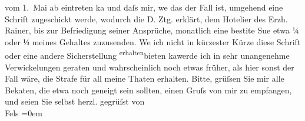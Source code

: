 \begin{ledgroupsized}[t]{13cm}
                    vom 1. Mai ab eintreten ka{\geminationn} und  daſs mir, we{\geminationn}
                    das der Fall ist, umgehend eine Schrift zugeschickt werde, wodurch die D. Ztg. erklärt, dem Hotelier des Erzh. Rainer, bis zur Befriedigung seiner Ansprüche,
                    monatlich eine besti{\geminationm}te Su{\geminationm}e etwa ¼ \introOben{}oder ⅓\introOben{} meines
                    Gehaltes zuzusenden. We{\geminationn} ich nicht in kürzester
                    Kürze diese Schrift oder eine andere Sicherstellung \substVorne{}\textsuperscript{erhalten}{\allowbreak}\substDazwischen{}bieten ka{\geminationn}\substHinten{}{ }{\pb}werde ich in sehr unangenehme
                    Verwickelungen geraten und wahrscheinlich noch etwas früher, als hier sonst der
                    Fall wäre, die Strafe für all meine Thaten erhalten.\pend
           \pstart
           Bitte, grüſsen Sie mir alle Beka{\geminationn}ten, die etwa noch
                    geneigt sein sollten, einen Gruſs von mir zu empfangen, und seien Sie selbst
                    herzl. gegrüſst\pend
           \pstart
           von{\\[\baselineskip]}\spacefill\mbox{Fels}\pend
           \leftskip=0em{}
         
         \endnumbering{}\end{ledgroupsized}  \newcommand{\dateiname}{L00198}\newcommand{\titel}{Friedrich M. Fels an Arthur Schnitzler, 20. 4. 1893}\newcommand{\editorInnen}{Martin Anton Müller und Gerd-Hermann Susen}
      